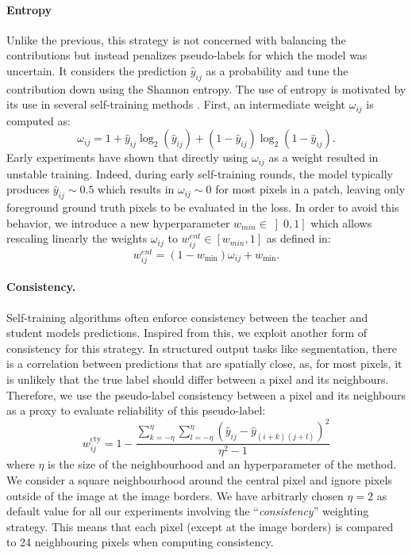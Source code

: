 \paragraph{Entropy} \label{par:strain:entropyweight} Unlike the previous, this strategy is not concerned with balancing the contributions but instead penalizes pseudo-labels for which the model was uncertain. It considers the prediction $\hat{y}_{ij}$ as a probability and tune the contribution down using the Shannon entropy. The use of entropy is motivated by its use in several self-training methods \parencite{grandvalet2004semi,lee2013pseudo}. First, an intermediate weight $\omega_{ij}$ is computed as: 
\begin{equation}
\omega_{ij} = 1 + \hat{y}_{ij} \log_2(\hat{y}_{ij}) + (1 - \hat{y}_{ij}) \log_2(1 - \hat{y}_{ij}).
\label{eqn:strain:entropyweight}
\end{equation}
Early experiments have shown that directly using $\omega_{ij}$ as a weight resulted in unstable training. Indeed, during early self-training rounds, the model typically produces $\hat{y}_{ij} \sim 0.5$ which results in $\omega_{ij} \sim 0$ for most pixels in a patch, leaving only foreground ground truth pixels to be evaluated in the loss. In order to avoid this behavior, we introduce a new hyperparameter $w_{min} \in \left]0, 1\right]$ which allows rescaling linearly the weights $\omega_{ij}$ to $w^{ent}_{ij} \in [w_{min},1]$ as defined in:
\begin{equation}
w^{ent}_{ij} = \left(1 - w_{\text{min}}\right) \omega_{ij} + w_{\text{min}}.
\label{eqn:strain:wminrescale}
\end{equation}

\paragraph{Consistency.} Self-training algorithms often enforce consistency between the teacher and student models predictions. Inspired from this, we exploit another form of consistency for this strategy. In structured output tasks like segmentation, there is a correlation between predictions that are spatially close, as, for most pixels, it is unlikely that the true label should differ between a pixel and its neighbours. Therefore, we use the pseudo-label consistency between a pixel and its neighbours as a proxy to evaluate reliability of this pseudo-label: %
\begin{equation}
w^{\text{cty}}_{ij} = 1 - \dfrac{\sum_{k=-\eta}^{\eta} \sum_{l=-\eta}^{\eta} (\hat{y}_{ij}- \hat{y}_{(i+k)(j+l)})^2}{\eta^2 - 1}
\end{equation}
where $\eta$ is the size of the neighbourhood and an hyperparameter of the method. We consider a square neighbourhood around the central pixel and ignore pixels outside of the image at the image borders. We have arbitrarly chosen $\eta = 2$ as default value for all our experiments involving the ``\textit{consistency}'' weighting strategy. This means that each pixel (except at the image borders) is compared to 24 neighbouring pixels when computing consistency. 

